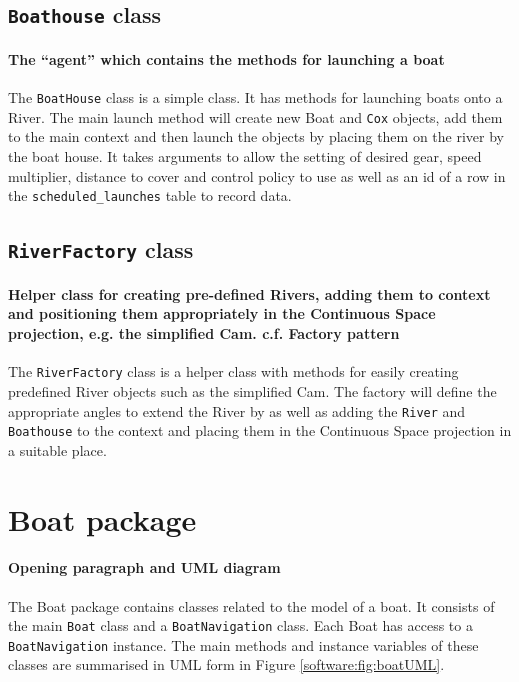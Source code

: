 \subsection{\texttt{Boathouse} class}
\paragraph{The ``agent'' which contains the methods for launching a boat}
The \texttt{BoatHouse} class is a simple class. It has methods for launching
boats onto a River. The main launch method will create new Boat and
\texttt{Cox} objects, add them to the main context and then launch the objects
by placing them on the river by the boat house. It takes arguments to
allow the setting of desired gear, speed multiplier, distance to
cover and control policy to use as well as an id of a row in the
\texttt{scheduled\_launches} table to record data.

\subsection{\texttt{RiverFactory} class}
\paragraph{Helper class for creating pre-defined Rivers, adding them
  to context and positioning them appropriately in the Continuous
  Space projection, e.g. the simplified Cam. c.f. Factory pattern}
The \texttt{RiverFactory} class is a helper class with methods for easily creating
predefined River objects such as the simplified Cam. The factory will
define the appropriate angles to extend the River by as well as adding
the \texttt{River} and \texttt{Boathouse} to the context and placing them in the
Continuous Space projection in a suitable place.

\section{Boat package}
\paragraph{Opening paragraph and UML diagram}
The Boat package contains classes related to the model of a boat. It
consists of the main \texttt{Boat} class and a \texttt{BoatNavigation} class. Each Boat
has access to a \texttt{BoatNavigation} instance. The main methods and instance variables of these classes are summarised in UML form in Figure \ref{software:fig:boatUML}.

